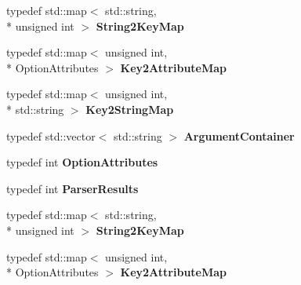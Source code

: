 \begin{DoxyCompactItemize}
\item 
\hypertarget{class_command_line_processing_1_1_argv_parser_a2c9d8a1f76332abcee2cf7a81cc03fb7}{typedef std\-::map$<$ std\-::string, \\*
unsigned int $>$ {\bfseries String2\-Key\-Map}}\label{class_command_line_processing_1_1_argv_parser_a2c9d8a1f76332abcee2cf7a81cc03fb7}

\item 
\hypertarget{class_command_line_processing_1_1_argv_parser_aa7a92cef773f3c498d09221598400f03}{typedef std\-::map$<$ unsigned int, \\*
Option\-Attributes $>$ {\bfseries Key2\-Attribute\-Map}}\label{class_command_line_processing_1_1_argv_parser_aa7a92cef773f3c498d09221598400f03}

\item 
\hypertarget{class_command_line_processing_1_1_argv_parser_aadf3e0f770d7e3ecc9cf0cd0ae0cc117}{typedef std\-::map$<$ unsigned int, \\*
std\-::string $>$ {\bfseries Key2\-String\-Map}}\label{class_command_line_processing_1_1_argv_parser_aadf3e0f770d7e3ecc9cf0cd0ae0cc117}

\item 
\hypertarget{class_command_line_processing_1_1_argv_parser_a66ef6261aaa6f4255e15d342f885d85b}{typedef std\-::vector$<$ std\-::string $>$ {\bfseries Argument\-Container}}\label{class_command_line_processing_1_1_argv_parser_a66ef6261aaa6f4255e15d342f885d85b}

\item 
\hypertarget{class_command_line_processing_1_1_argv_parser_a09e98f88e306ec9a2fb780f05981a857}{typedef int {\bfseries Option\-Attributes}}\label{class_command_line_processing_1_1_argv_parser_a09e98f88e306ec9a2fb780f05981a857}

\item 
\hypertarget{class_command_line_processing_1_1_argv_parser_a2b812f40e18434aa89eb826ff06535ce}{typedef int {\bfseries Parser\-Results}}\label{class_command_line_processing_1_1_argv_parser_a2b812f40e18434aa89eb826ff06535ce}

\item 
\hypertarget{class_command_line_processing_1_1_argv_parser_a2c9d8a1f76332abcee2cf7a81cc03fb7}{typedef std\-::map$<$ std\-::string, \\*
unsigned int $>$ {\bfseries String2\-Key\-Map}}\label{class_command_line_processing_1_1_argv_parser_a2c9d8a1f76332abcee2cf7a81cc03fb7}

\item 
\hypertarget{class_command_line_processing_1_1_argv_parser_aa7a92cef773f3c498d09221598400f03}{typedef std\-::map$<$ unsigned int, \\*
Option\-Attributes $>$ {\bfseries Key2\-Attribute\-Map}}\label{class_command_line_processing_1_1_argv_parser_aa7a92cef773f3c498d09221598400f03}


\end{DoxyCompactItemize}
